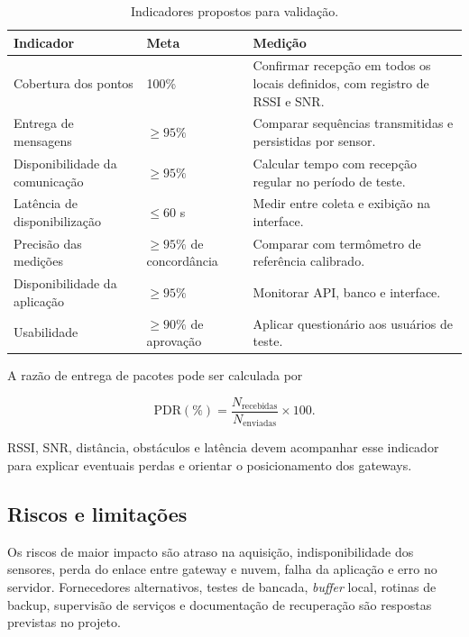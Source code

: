 \documentclass[10pt,a4paper,twocolumn]{article}
\begin{document}
\begin{table}[t]
\centering
\caption{Indicadores propostos para validação.}
\label{tab:indicadores}
\begin{tabularx}{\textwidth}{@{}p{3.2cm}p{2.5cm}X@{}}
\toprule
\textbf{Indicador} & \textbf{Meta} & \textbf{Medição} \\
\midrule
Cobertura dos pontos & 100\% & Confirmar recepção em todos os locais
definidos, com registro de RSSI e SNR. \\
Entrega de mensagens & $\geq 95\%$ & Comparar sequências transmitidas e
persistidas por sensor. \\
Disponibilidade da comunicação & $\geq 95\%$ & Calcular tempo com recepção
regular no período de teste. \\
Latência de disponibilização & $\leq 60$ s & Medir entre coleta e exibição na
interface. \\
Precisão das medições & $\geq 95\%$ de concordância & Comparar com termômetro
de referência calibrado. \\
Disponibilidade da aplicação & $\geq 95\%$ & Monitorar API, banco e interface. \\
Usabilidade & $\geq 90\%$ de aprovação & Aplicar questionário aos usuários de
teste. \\
\bottomrule
\end{tabularx}
\end{table}

A razão de entrega de pacotes pode ser calculada por

\begin{equation}
\mathrm{PDR}(\%) =
\frac{N_{\mathrm{recebidas}}}{N_{\mathrm{enviadas}}}\times 100.
\end{equation}

RSSI, SNR, distância, obstáculos e latência devem acompanhar esse indicador para
explicar eventuais perdas e orientar o posicionamento dos gateways.

\subsection{Riscos e limitações}

Os riscos de maior impacto são atraso na aquisição, indisponibilidade dos
sensores, perda do enlace entre gateway e nuvem, falha da aplicação e erro no
servidor. Fornecedores alternativos, testes de bancada, \textit{buffer} local,
rotinas de backup, supervisão de serviços e documentação de recuperação são
respostas previstas no projeto.
\end{document}
